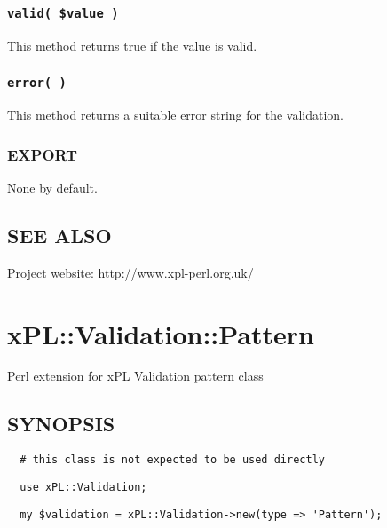 \documentclass[12pt,a4paper]{article}
\begin{document}
\subsubsection*{\texttt{valid( \$value )}\label{xPL::Validation::IP_valid_value_}}


This method returns true if the value is valid.

\subsubsection*{\texttt{error( )}\label{xPL::Validation::IP_error_}}


This method returns a suitable error string for the validation.

\subsubsection*{EXPORT\label{xPL::Validation::IP_EXPORT}}


None by default.

\subsection*{SEE ALSO\label{xPL::Validation::IP_SEE_ALSO}}


Project website: http://www.xpl-perl.org.uk/

\newpage
\section{xPL::Validation::Pattern\label{xPL::Validation::Pattern}}


Perl extension for xPL Validation pattern class

\subsection*{SYNOPSIS\label{xPL::Validation::Pattern_SYNOPSIS}}
\begin{verbatim}
  # this class is not expected to be used directly
\end{verbatim}
\begin{verbatim}
  use xPL::Validation;
\end{verbatim}
\begin{verbatim}
  my $validation = xPL::Validation->new(type => 'Pattern');
\end{verbatim}
\end{document}
